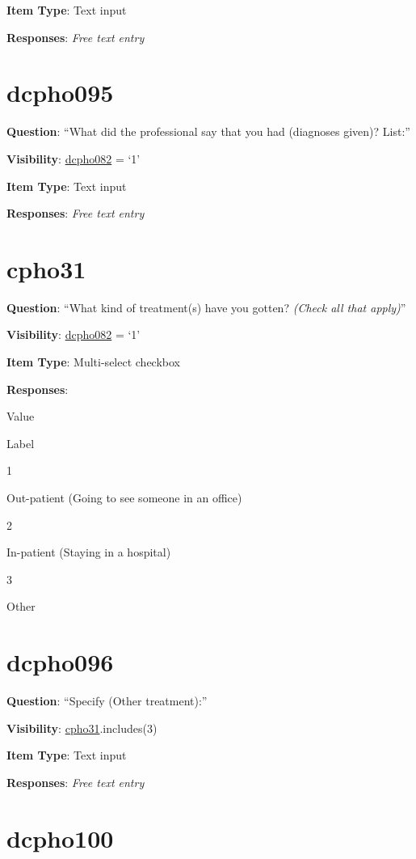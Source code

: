 \documentclass[]{book}
\begin{document}
\textbf{Item Type}: Text input

\textbf{Responses}: \emph{Free text entry}

\hypertarget{dcpho095}{%
\section{dcpho095}\label{dcpho095}}

\textbf{Question}: ``What did the professional say that you had (diagnoses given)? List:''

\textbf{Visibility}: \protect\hyperlink{dcpho082}{dcpho082} = `1'

\textbf{Item Type}: Text input

\textbf{Responses}: \emph{Free text entry}

\hypertarget{cpho31}{%
\section{cpho31}\label{cpho31}}

\textbf{Question}: ``What kind of treatment(s) have you gotten? \emph{(Check all that apply)}''

\textbf{Visibility}: \protect\hyperlink{dcpho082}{dcpho082} = `1'

\textbf{Item Type}: Multi-select checkbox

\textbf{Responses}:

Value

Label

1

Out-patient (Going to see someone in an office)

2

In-patient (Staying in a hospital)

3

Other

\hypertarget{dcpho096}{%
\section{dcpho096}\label{dcpho096}}

\textbf{Question}: ``Specify (Other treatment):''

\textbf{Visibility}: \protect\hyperlink{cpho31}{cpho31}.includes(3)

\textbf{Item Type}: Text input

\textbf{Responses}: \emph{Free text entry}

\hypertarget{dcpho100}{%
\section{dcpho100}\label{dcpho100}}
\end{document}
